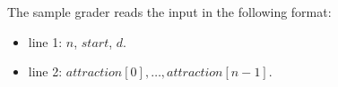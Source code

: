 The sample grader reads the input in the following format:
\begin{itemize}
\item line 1: $n$, $start$, $d$.
\item line 2: $attraction[0], \ldots, attraction[n - 1]$.
\end{itemize}